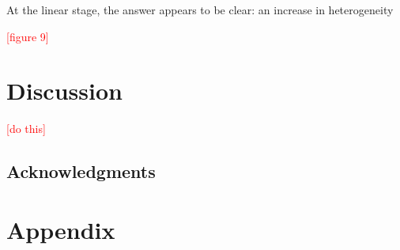 \documentclass[12pt]{article}
\begin{document}
	At the linear stage, the answer appears to be clear: an increase in heterogeneity
	
\textcolor{red}{[figure 9]}



\section{Discussion}

\textcolor{red}{[do this]}

\subsection*{Acknowledgments}


\section{Appendix}
\end{document}
